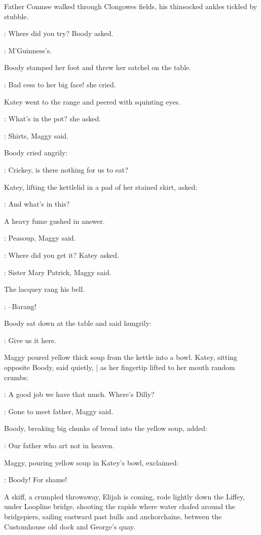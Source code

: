 Father Conmee walked through Clongowes fields,
his thinsocked ankles tickled by stubble.

\boody:
Where did you try? Boody asked.

\maggy:
M'Guinness's.

Boody stamped her foot and threw her satchel on the table.

\boody:
Bad cess to her big face! she cried.

Katey went to the range
and peered with squinting eyes.

\katey:
What's in the pot? she asked.

\maggy:
Shirts, Maggy said.

Boody cried angrily:

\boody:
Crickey, is there nothing for us to eat?

Katey, lifting the kettlelid in a pad of her stained skirt, asked:

\katey:
And what's in this?

A heavy fume gushed in answer.

\maggy:
Peasoup, Maggy said.

\katey:
Where did you get it? Katey asked.

\maggy:
Sister Mary Patrick,
Maggy said.

The lacquey rang his bell.

\lacquey:
--Barang!

Boody sat down at the table and said hungrily:

\boody:
Give us it here.

Maggy poured yellow thick soup from the kettle into a bowl.
Katey, sitting opposite Boody, said quietly, |
as her fingertip lifted to her mouth random crumbs:

\katey:
A good job we have that much. Where's Dilly?

\maggy:
Gone to meet father, Maggy said.

Boody, breaking big chunks of bread into the yellow soup,
added:

\boody:
Our father who art not in heaven.

Maggy, pouring yellow soup in Katey's bowl, exclaimed:

\maggy:
Boody! For shame!

A skiff,
a crumpled throwaway,
Elijah is coming,
rode lightly down the Liffey,
under Loopline bridge,
shooting the rapids where water chafed around the bridgepiers,
sailing eastward past hulls and anchorchains,
between the Customhouse old dock and George's quay.

